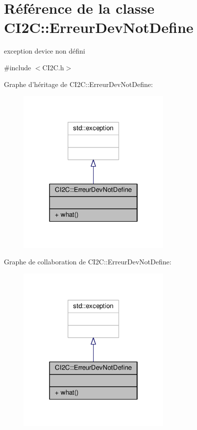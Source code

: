 \hypertarget{classCI2C_1_1ErreurDevNotDefine}{\section{Référence de la classe C\+I2\+C\+:\+:Erreur\+Dev\+Not\+Define}
\label{classCI2C_1_1ErreurDevNotDefine}
}


exception device non défini  




{\ttfamily \#include $<$C\+I2\+C.\+h$>$}



Graphe d'héritage de C\+I2\+C\+:\+:Erreur\+Dev\+Not\+Define\+:\nopagebreak
\begin{figure}[H]
\begin{center}
\leavevmode
\includegraphics[width=214pt]{classCI2C_1_1ErreurDevNotDefine__inherit__graph}
\end{center}
\end{figure}


Graphe de collaboration de C\+I2\+C\+:\+:Erreur\+Dev\+Not\+Define\+:\nopagebreak
\begin{figure}[H]
\begin{center}
\leavevmode
\includegraphics[width=214pt]{classCI2C_1_1ErreurDevNotDefine__coll__graph}
\end{center}
\end{figure}
